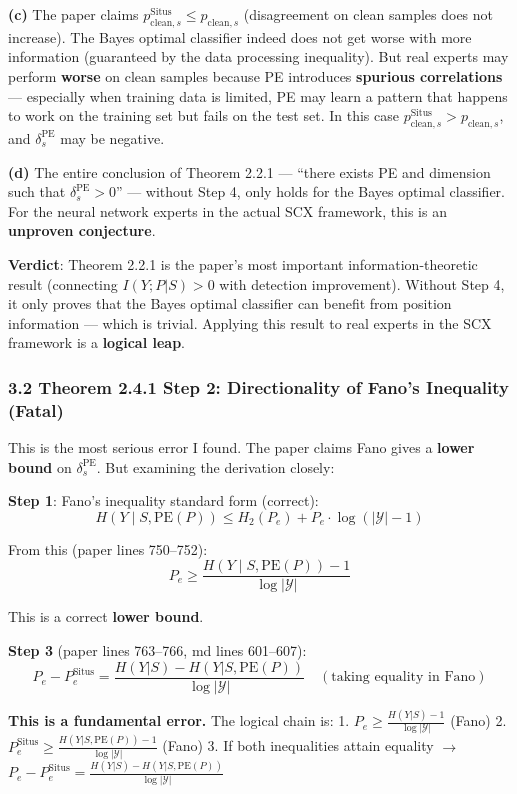 \documentclass[
  12pt,
]{article}
\begin{document}
\textbf{(c)} The paper claims $p_{\text{clean},s}^{\text{Situs}} \leq p_{\text{clean},s}$ (disagreement on clean samples does not increase). The Bayes optimal classifier indeed does not get worse with more information (guaranteed by the data processing inequality). But real experts may perform \textbf{worse} on clean samples because PE introduces \textbf{spurious correlations} --- especially when training data is limited, PE may learn a pattern that happens to work on the training set but fails on the test set. In this case $p_{\text{clean},s}^{\text{Situs}} > p_{\text{clean},s}$, and $\delta_s^{\text{PE}}$ may be negative.

\textbf{(d)} The entire conclusion of Theorem 2.2.1 --- ``there exists PE and dimension such that $\delta_s^{\text{PE}} > 0$'' --- without Step 4, only holds for the Bayes optimal classifier. For the neural network experts in the actual SCX framework, this is an \textbf{unproven conjecture}.

\textbf{Verdict}: Theorem 2.2.1 is the paper's most important information-theoretic result (connecting $I(Y;P|S) > 0$ with detection improvement). Without Step 4, it only proves that the Bayes optimal classifier can benefit from position information --- which is trivial. Applying this result to real experts in the SCX framework is a \textbf{logical leap}.

\subsubsection{3.2 Theorem 2.4.1 Step 2: Directionality of Fano's Inequality (Fatal)}\label{thm-2.4.1-step2}

This is the most serious error I found. The paper claims Fano gives a \textbf{lower bound} on $\delta_s^{\text{PE}}$. But examining the derivation closely:

\textbf{Step 1}: Fano's inequality standard form (correct):
\[H(Y \mid S, \text{PE}(P)) \leq H_2(P_e) + P_e \cdot \log(|\mathcal{Y}| - 1)\]

From this (paper lines 750--752):
\[P_e \geq \frac{H(Y \mid S, \text{PE}(P)) - 1}{\log |\mathcal{Y}|}\]

This is a correct \textbf{lower bound}.

\textbf{Step 3} (paper lines 763--766, md lines 601--607):
\[P_e - P_e^{\text{Situs}} = \frac{H(Y|S) - H(Y|S, \text{PE}(P))}{\log |\mathcal{Y}|} \quad (\text{taking equality in Fano})\]

\textbf{This is a fundamental error.} The logical chain is:
1. $P_e \geq \frac{H(Y|S)-1}{\log|\mathcal{Y}|}$ (Fano)
2. $P_e^{\text{Situs}} \geq \frac{H(Y|S,\text{PE}(P))-1}{\log|\mathcal{Y}|}$ (Fano)
3. If both inequalities attain equality $\to$ $P_e - P_e^{\text{Situs}} = \frac{H(Y|S) - H(Y|S,\text{PE}(P))}{\log|\mathcal{Y}|}$
\end{document}
